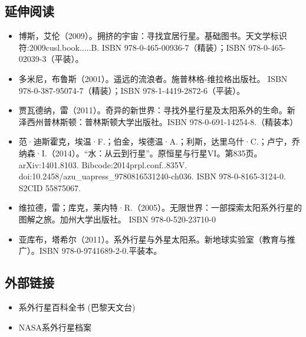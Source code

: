 \subsection{延伸阅读}
\begin{itemize}
\item 博斯，艾伦（2009）。拥挤的宇宙：寻找宜居行星。基础图书。天文学标识符:2009cusl.book.....B. ISBN 978-0-465-00936-7（精装）；ISBN 978-0-465-02039-3（平装）。
\item 多米尼，布鲁斯（2001）。遥远的流浪者。施普林格-维拉格出版社。 ISBN 978-0-387-95074-7（精装）；ISBN 978-1-4419-2872-6（平装）。
\item 贾瓦德纳，雷（2011）。奇异的新世界：寻找外星行星及太阳系外的生命。新泽西州普林斯顿：普林斯顿大学出版社。ISBN 978-0-691-14254-8.（精装本）
\item 范·迪斯霍克，埃温·F.；伯金，埃德温·A.；利斯，达里乌什·C.；卢宁，乔纳森·I.（2014）。“水：从云到行星”。原恒星与行星VI。第835页。arXiv:1401.8103. Bibcode:2014prpl.conf..835V. doi:10.2458/azu_uapress_9780816531240-ch036. ISBN 978-0-8165-3124-0. S2CID 55875067.
\item 维拉德，雷；库克，莱内特·R.（2005）。无限世界：一部探索太阳系外行星的图解之旅。加州大学出版社。 ISBN 978-0-520-23710-0
\item 亚库布，塔希尔（2011）。系外行星与外星太阳系。新地球实验室（教育与推广）。ISBN 978-0-9741689-2-0.平装本。
\end{itemize}
\subsection{外部链接}
\begin{itemize}
\item 系外行星百科全书 (巴黎天文台)
\item NASA系外行星档案
\end{itemize}